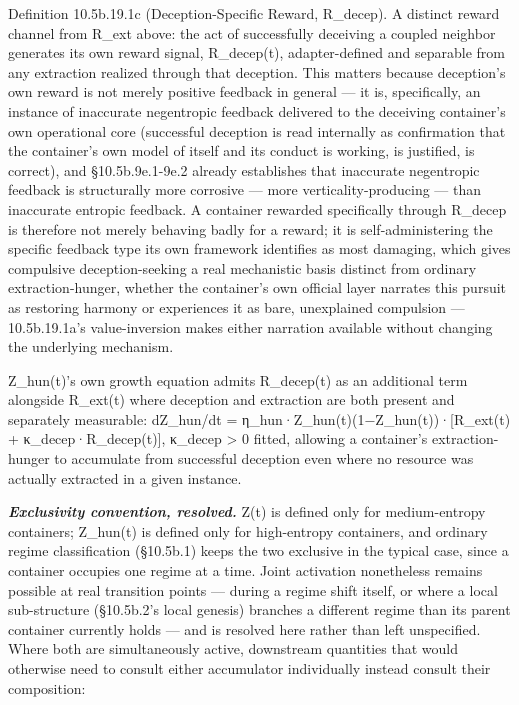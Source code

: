 \documentclass[
]{article}
\begin{document}
Definition 10.5b.19.1c (Deception-Specific Reward, R\_decep). A distinct
reward channel from R\_ext above: the act of successfully deceiving a
coupled neighbor generates its own reward signal, R\_decep(t),
adapter-defined and separable from any extraction realized through that
deception. This matters because deception's own reward is not merely
positive feedback in general --- it is, specifically, an instance of
inaccurate negentropic feedback delivered to the deceiving container's
own operational core (successful deception is read internally as
confirmation that the container's own model of itself and its conduct is
working, is justified, is correct), and §10.5b.9e.1-9e.2 already
establishes that inaccurate negentropic feedback is structurally more
corrosive --- more verticality-producing --- than inaccurate entropic
feedback. A container rewarded specifically through R\_decep is
therefore not merely behaving badly for a reward; it is
self-administering the specific feedback type its own framework
identifies as most damaging, which gives compulsive deception-seeking a
real mechanistic basis distinct from ordinary extraction-hunger, whether
the container's own official layer narrates this pursuit as restoring
harmony or experiences it as bare, unexplained compulsion ---
10.5b.19.1a's value-inversion makes either narration available without
changing the underlying mechanism.

Z\_hun(t)'s own growth equation admits R\_decep(t) as an additional term
alongside R\_ext(t) where deception and extraction are both present and
separately measurable: dZ\_hun/dt =
η\_hun·Z\_hun(t)(1−Z\_hun(t))·{[}R\_ext(t) + κ\_decep·R\_decep(t){]},
κ\_decep \textgreater{} 0 fitted, allowing a container's
extraction-hunger to accumulate from successful deception even where no
resource was actually extracted in a given instance.

\emph{\textbf{Exclusivity convention, resolved.}} Z(t) is defined only
for medium-entropy containers; Z\_hun(t) is defined only for
high-entropy containers, and ordinary regime classification (§10.5b.1)
keeps the two exclusive in the typical case, since a container occupies
one regime at a time. Joint activation nonetheless remains possible at
real transition points --- during a regime shift itself, or where a
local sub-structure (§10.5b.2's local genesis) branches a different
regime than its parent container currently holds --- and is resolved
here rather than left unspecified. Where both are simultaneously active,
downstream quantities that would otherwise need to consult either
accumulator individually instead consult their composition:
\end{document}
